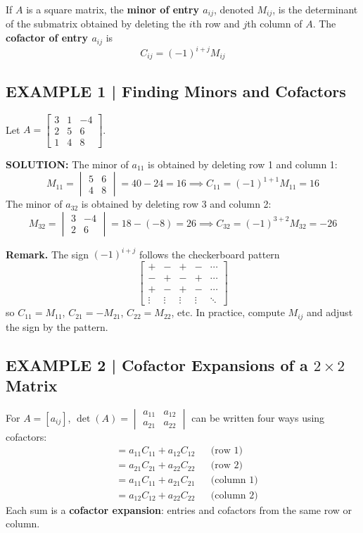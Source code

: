 \documentclass{article}
\theoremstyle{mystyle}
\begin{document}
\begin{tcolorbox}[colback=teal!4, colframe=teal!65!black,
  title={\textbf{Definition 1}}, boxrule=0.5mm, arc=3mm]
If $A$ is a square matrix, the \textbf{minor of entry $a_{ij}$}, denoted $M_{ij}$, is the determinant of the submatrix obtained by deleting the $i$th row and $j$th column of $A$. The \textbf{cofactor of entry $a_{ij}$} is
\[
C_{ij}=(-1)^{i+j}M_{ij}
\]
\end{tcolorbox}

\subsection*{EXAMPLE 1 | Finding Minors and Cofactors}
Let $A=\begin{bmatrix}3&1&-4\\2&5&6\\1&4&8\end{bmatrix}$.

\textbf{SOLUTION:} The minor of $a_{11}$ is obtained by deleting row 1 and column 1:
\[
M_{11}=\begin{vmatrix}5&6\\4&8\end{vmatrix}=40-24=16 \implies C_{11}=(-1)^{1+1}M_{11}=16
\]
The minor of $a_{32}$ is obtained by deleting row 3 and column 2:
\[
M_{32}=\begin{vmatrix}3&-4\\2&6\end{vmatrix}=18-(-8)=26 \implies C_{32}=(-1)^{3+2}M_{32}=-26
\]

\textbf{Remark.} The sign $(-1)^{i+j}$ follows the checkerboard pattern
\[
\begin{bmatrix}+&-&+&-&\cdots\\-&+&-&+&\cdots\\+&-&+&-&\cdots\\\vdots&\vdots&\vdots&\vdots&\ddots\end{bmatrix}
\]
so $C_{11}=M_{11}$, $C_{21}=-M_{21}$, $C_{22}=M_{22}$, etc. In practice, compute $M_{ij}$ and adjust the sign by the pattern.

\subsection*{EXAMPLE 2 | Cofactor Expansions of a $2\times2$ Matrix}
For $A=[a_{ij}]$, $\det(A)=\begin{vmatrix}a_{11}&a_{12}\\a_{21}&a_{22}\end{vmatrix}$ can be written four ways using cofactors:
\begin{align*}
&= a_{11}C_{11}+a_{12}C_{12} &&\text{(row 1)}\\
&= a_{21}C_{21}+a_{22}C_{22} &&\text{(row 2)}\\
&= a_{11}C_{11}+a_{21}C_{21} &&\text{(column 1)}\\
&= a_{12}C_{12}+a_{22}C_{22} &&\text{(column 2)} \tag{6}
\end{align*}
Each sum is a \textbf{cofactor expansion}: entries and cofactors from the same row or column.
\end{document}
